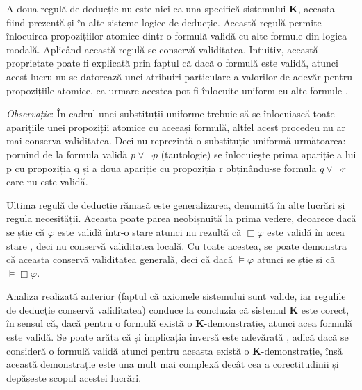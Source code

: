 \documentclass[12pt, openany]{book}
\begin{document}
            \par{}
                A doua regulă de deducție nu este nici ea una specifică sistemului \textbf{K}, aceasta fiind prezentă și 
                în alte sisteme logice de deducție. Această regulă permite înlocuirea propozițiilor atomice dintr-o formulă 
                validă cu alte formule din logica modală. Aplicând această regulă se conservă validitatea. Intuitiv, această
                proprietate poate fi explicată prin faptul că dacă o formulă este validă, atunci acest lucru nu se datorează
                unei atribuiri particulare a valorilor de adevăr pentru propozițiile atomice, ca urmare acestea pot fi 
                înlocuite uniform cu alte formule \cite{modal_logic}.

            \par{}
                \noindent \textit{Observație}: În cadrul unei substituții uniforme trebuie să se înlocuiască toate 
                aparițiile unei propoziții atomice cu aceeași formulă, altfel acest procedeu nu ar mai conserva validitatea.
                Deci nu reprezintă o substituție uniformă următoarea: pornind de la formula validă $p \vee \neg p$ 
                (tautologie) se înlocuiește prima apariție a lui p cu propoziția q și a doua apariție cu propoziția r obținându-se 
                formula $q \vee \neg r$ care nu este validă.

            \par{}
                Ultima regulă de deducție rămasă este generalizarea, denumită în alte lucrări și regula necesității. Aceasta
                poate părea neobișnuită la prima vedere, deoarece dacă se știe că $\varphi$ este validă într-o stare atunci nu 
                rezultă că $\Box \varphi$ este validă în acea stare \cite{lecture_notes_hedin}, deci nu conservă validitatea
                locală. Cu toate acestea, se poate demonstra că aceasta conservă validitatea generală, deci că dacă $\vDash 
                \varphi$ atunci se știe și că $\vDash \Box \varphi$.

            \par{}
                Analiza realizată anterior (faptul că axiomele sistemului sunt valide, iar regulile de deducție conservă 
                validitatea) conduce la concluzia că sistemul \textbf{K} este corect, în sensul că, dacă pentru o formulă
                există o \textbf{K}-demonstrație, atunci acea formulă este validă. Se poate arăta că și implicația inversă 
                este adevărată \cite{handbook_modal_logic}, adică dacă se consideră o formulă validă atunci pentru aceasta 
                există o \textbf{K}-demonstrație, însă această demonstrație este una mult mai complexă decât cea a 
                corectitudinii și depășeste scopul acestei lucrări.
\end{document}
